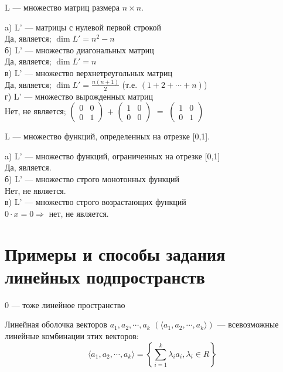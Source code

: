 \begin{prim}
	L --- множество матриц размера $n \times n$.
\end{prim}
a) L' --- матрицы с нулевой первой строкой\\
Да, является;  $\dim  L'=n^2-n$\\
б) L' --- множество диагональных матриц\\
Да, является;  $\dim  L'=n$\\
в) L' --- множество верхнетреугольных матриц\\
Да, является;  $\dim  L'=\frac{n(n+1)}{2}$   (т.е. $(1+2+\cdots +n)$) \\
г) L' --- множество вырожденных матриц\\
Нет, не является;
$\left( %
\begin{smallmatrix}
0&0 \\
0&1 
\end{smallmatrix} 
\right)$  
$+$
$\left(
\begin{smallmatrix}
1&0 \\
0&0 
\end{smallmatrix} 
\right)$  
$=$
$\left(
\begin{smallmatrix}
1&0 \\
0&1 
\end{smallmatrix} 
\right)$  
\\

\begin{prim}
	L --- множество функций, определенных на отрезке [0,1].
\end{prim}
a) L' --- множество функций, ограниченных на отрезке [0,1]\\
Да, является. \\
б) L' --- множество строго монотонных функций\\
Нет, не является. \\
в) L' --- множество строго возрастающих функций\\
$0\cdot x = 0 \Longrightarrow$ нет, не является. \\

\section{Примеры и способы задания линейных подпространств}

0 --- тоже линейное пространство
\begin{definition}
	Линейная оболочка векторов $a_1, a_2, \cdots , a_k$  $(\langle a_1, a_2, \cdots , a_k\rangle )$ --- всевозможные линейные комбинации этих векторов:
	$$\langle a_1, a_2, \cdots , a_k\rangle =\left\{ \sum\limits^k _{i= 1} \lambda_i  a_i  , \lambda_i \in R \right\}$$ 
\end{definition}

